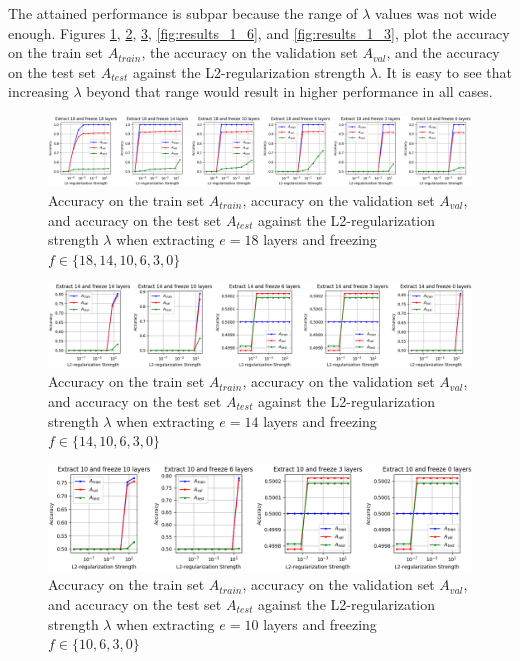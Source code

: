 The attained performance is subpar because the range of $\lambda$ values was not wide enough. Figures \ref{fig:results_1_18}, \ref{fig:results_1_14}, \ref{fig:results_1_10}, \ref{fig:results_1_6}, and \ref{fig:results_1_3}, plot the accuracy on the train set $A_{train}$, the accuracy on the validation set $A_{val}$, and the accuracy on the test set $A_{test}$ against the L2-regularization strength $\lambda$. It is easy to see that increasing $\lambda$ beyond that range would result in higher performance in all cases.

\begin{figure}[ht]
    \centering
    \includegraphics[width=1.0\textwidth]{figs/results_1_18.png}
    \caption{Accuracy on the train set $A_{train}$, accuracy on the validation set $A_{val}$, and accuracy on the test set $A_{test}$ against the L2-regularization strength $\lambda$ when extracting $e = 18$ layers and freezing $f \in \{18, 14, 10, 6, 3, 0\}$}
    \label{fig:results_1_18}
\end{figure}

\begin{figure}[ht]
    \centering
    \includegraphics[width=1.0\textwidth]{figs/results_1_14.png}
    \caption{Accuracy on the train set $A_{train}$, accuracy on the validation set $A_{val}$, and accuracy on the test set $A_{test}$ against the L2-regularization strength $\lambda$ when extracting $e = 14$ layers and freezing $f \in \{14, 10, 6, 3, 0\}$}
    \label{fig:results_1_14}
\end{figure}

\begin{figure}[ht]
    \centering
    \includegraphics[width=1.0\textwidth]{figs/results_1_10.png}
    \caption{Accuracy on the train set $A_{train}$, accuracy on the validation set $A_{val}$, and accuracy on the test set $A_{test}$ against the L2-regularization strength $\lambda$ when extracting $e = 10$ layers and freezing $f \in \{10, 6, 3, 0\}$}
    \label{fig:results_1_10}
\end{figure}

